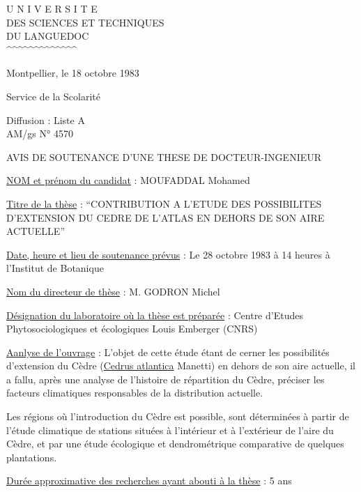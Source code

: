 
\begin{center}
U N I V E R S I T E\\
DES SCIENCES ET TECHNIQUES\\
DU LANGUEDOC\\
\textasciicircum\textasciicircum\textasciicircum\textasciicircum\textasciicircum\textasciicircum\textasciicircum\textasciicircum\textasciicircum\textasciicircum\textasciicircum\textasciicircum\textasciicircum
\end{center}

Montpellier, le 18 octobre 1983

Service de la Scolarité

Diffusion : Liste A\\
AM/gs \hfill N° 4570

\begin{center}
AVIS DE SOUTENANCE D'UNE THESE DE DOCTEUR-INGENIEUR

\end{center}

\uline{NOM et prénom du candidat} : MOUFADDAL Mohamed

\uline{Titre de la thèse} : ``CONTRIBUTION A L'ETUDE DES POSSIBILITES D'EXTENSION DU CEDRE DE L'ATLAS EN DEHORS DE SON AIRE ACTUELLE''

\uline{Date, heure et lieu de soutenance prévus} : Le 28 octobre 1983 à 14 heures à l'Institut de Botanique

\uline{Nom du directeur de thèse} : M. GODRON Michel

\uline{Désignation du laboratoire où la thèse est préparée} : Centre d'Etudes Phytosociologiques et écologiques Louis Emberger (CNRS)

\uline{Aanlyse de l'ouvrage} : L'objet de cette étude étant de cerner les possibilités d'extension du Cèdre (\uline{Cedrus atlantica} Manetti) en dehors de son aire actuelle, il a fallu, après une analyse de l'histoire de répartition du Cèdre, préciser les facteurs climatiques responsables de la distribution actuelle.

Les régions où l'introduction du Cèdre est possible, sont déterminées à partir de l'étude climatique de stations situées à l'intérieur et à l'extérieur de l'aire du Cèdre, et par une étude écologique et dendrométrique comparative de quelques plantations.

\uline{Durée approximative des recherches ayant abouti à la thèse} : 5 ans

